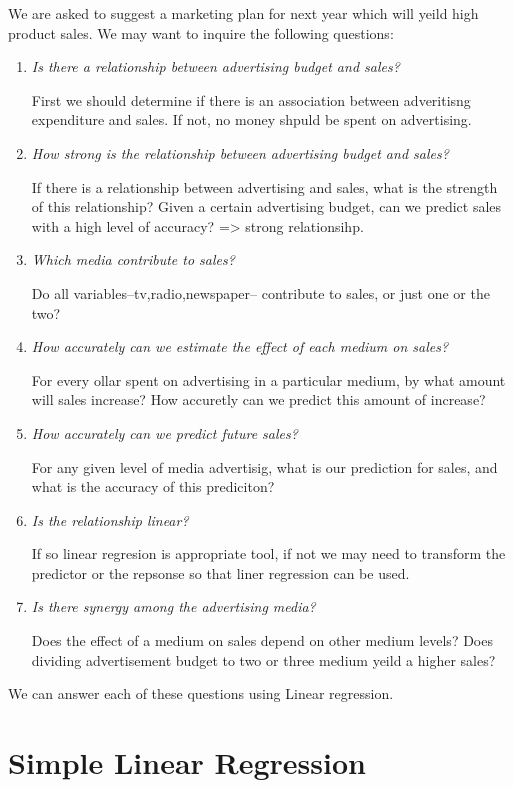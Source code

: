 \documentclass[
  letterpaper,
  DIV=11,
  numbers=noendperiod]{scrreprt}
\begin{document}
We are asked to suggest a marketing plan for next year which will yeild
high product sales. We may want to inquire the following questions:

\begin{enumerate}
\def\labelenumi{\arabic{enumi}.}
\item
  \emph{Is there a relationship between advertising budget and sales?}

  First we should determine if there is an association between
  adveritisng expenditure and sales. If not, no money shpuld be spent on
  advertising.
\item
  \emph{How strong is the relationship between advertising budget and
  sales?}

  If there is a relationship between advertising and sales, what is the
  strength of this relationship? Given a certain advertising budget, can
  we predict sales with a high level of accuracy? =\textgreater{} strong
  relationsihp.
\item
  \emph{Which media contribute to sales?}

  Do all variables--tv,radio,newspaper-- contribute to sales, or just
  one or the two?
\item
  \emph{How accurately can we estimate the effect of each medium on
  sales?}

  For every ollar spent on advertising in a particular medium, by what
  amount will sales increase? How accuretly can we predict this amount
  of increase?
\item
  \emph{How accurately can we predict future sales?}

  For any given level of media advertisig, what is our prediction for
  sales, and what is the accuracy of this prediciton?
\item
  \emph{Is the relationship linear?}

  If so linear regresion is appropriate tool, if not we may need to
  transform the predictor or the repsonse so that liner regression can
  be used.
\item
  \emph{Is there synergy among the advertising media?}

  Does the effect of a medium on sales depend on other medium levels?
  Does dividing advertisement budget to two or three medium yeild a
  higher sales?
\end{enumerate}

We can answer each of these questions using Linear regression.

\hypertarget{simple-linear-regression}{%
\section{Simple Linear Regression}\label{simple-linear-regression}}
\end{document}
